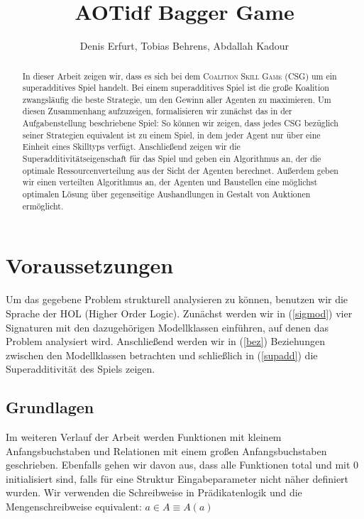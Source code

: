 \documentclass[sigconf]{acmart}
\theoremstyle{break}
\begin{document}
\title{AOTidf Bagger Game}
\author{Denis Erfurt, Tobias Behrens, Abdallah Kadour}

\begin{abstract}
  \noindent
  In dieser Arbeit zeigen wir, dass es sich bei dem \textsc{Coalition Skill Game} (CSG) um ein superadditives Spiel handelt. Bei einem superadditives Spiel ist die große Koalition zwangsläufig die beste Strategie, um den Gewinn aller Agenten zu maximieren. Um diesen Zusammenhang aufzuzeigen, formalisieren wir zunächst das in der Aufgabenstellung beschriebene Spiel: So können wir zeigen, dass jedes CSG bezüglich seiner Strategien equivalent ist zu einem Spiel, in dem jeder Agent nur über eine Einheit eines Skilltyps verfügt. Anschließend zeigen wir die Superadditivitätseigenschaft für das Spiel und geben ein Algorithmus an, der die optimale Ressourcenverteilung aus der Sicht der Agenten berechnet. Außerdem geben wir einen verteilten Algorithmus an, der Agenten und Baustellen eine möglichst optimalen Lösung über gegenseitige Aushandlungen in Gestalt von Auktionen ermöglicht.
\end{abstract}



\maketitle


\section{Voraussetzungen}
Um das gegebene Problem strukturell analysieren zu können, benutzen wir die Sprache der HOL (Higher Order Logic). Zunächst werden wir in (\ref{sigmod}) vier Signaturen mit den dazugehörigen Modellklassen einführen, auf denen das Problem analysiert wird. Anschließend werden wir in (\ref{bez}) Beziehungen zwischen den Modellklassen betrachten und schließlich in (\ref{supadd}) die Superadditivität des Spiels zeigen.
\\


\subsection{Grundlagen}
  Im weiteren Verlauf der Arbeit werden Funktionen mit kleinem Anfangsbuchstaben und Relationen mit einem großen Anfangsbuchstaben geschrieben. Ebenfalls gehen wir davon aus, dass alle Funktionen total und mit 0 initialisiert sind, falls für eine Struktur Eingabeparameter nicht näher definiert wurden. Wir verwenden die Schreibweise in Prädikatenlogik und die Mengenschreibweise equivalent: $a\in A \equiv A(a)$
\end{document}
